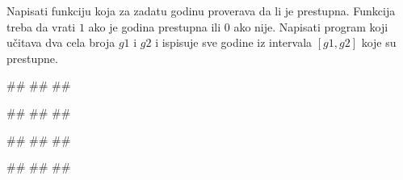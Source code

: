 \begin{Exercise}[label=p1.4_07] 
Napisati funkciju  koja za zadatu
godinu proverava da li je prestupna. Funkcija treba da vrati $1$ ako
je godina prestupna ili $0$ ako nije. Napisati program koji učitava
dva cela broja $g1$ i $g2$ i ispisuje sve godine iz intervala $[g1,
  g2]$ koje su prestupne.
 
\begin{miditest}
\begin{upotreba}{1}
#\naslovInt#
##
##
\end{upotreba}
\end{miditest}
\begin{miditest}
\begin{upotreba}{2}
#\naslovInt#
##
##
\end{upotreba}
\end{miditest}

\begin{miditest}
\begin{upotreba}{3}
#\naslovInt#
##
##
\end{upotreba}
\end{miditest}
\begin{miditest}
\begin{upotreba}{4}
#\naslovInt#
##
##
\end{upotreba}
\end{miditest}
\end{Exercise}
\ifresenja 
\begin{Answer}[ref=p1.4_07]
\end{Answer} 
\fi


